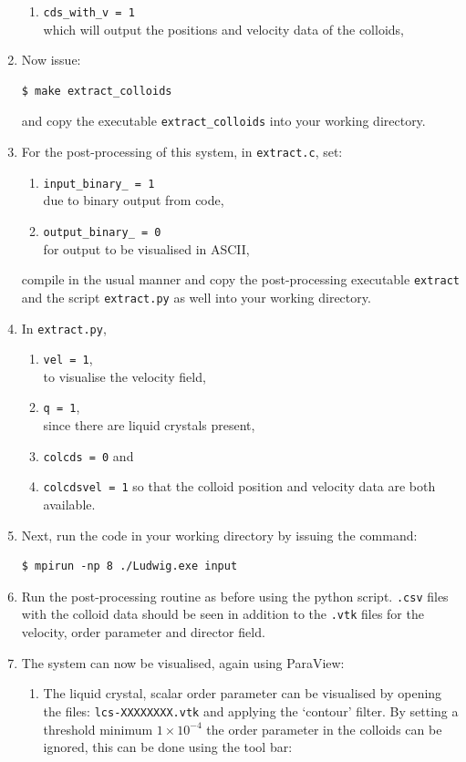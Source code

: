 \documentclass[11pt,twoside,a4paper]{article}
\begin{document}
\begin{enumerate}
\begin{enumerate}
\item \texttt{cds\_with\_v  = 1} \\ which will output the positions and velocity data of the colloids,
\end{enumerate}
\item Now issue: \\
\begin{lstlisting}
$ make extract_colloids
\end{lstlisting}
and copy the executable \texttt{extract\_colloids} into your working directory.
\item For the post-processing of this system, in \texttt{extract.c}, set:
\begin{enumerate}
\item \texttt{input\_binary\_  = 1} \\ due to binary output from code,
\item \texttt{output\_binary\_ = 0} \\ for output to be visualised in ASCII,
\end{enumerate}
compile in the usual manner and copy the post-processing executable \texttt{extract} and 
the script \texttt{extract.py} as well into your working directory. 
\item In \texttt{extract.py},
\begin{enumerate}
\item \texttt{vel = 1}, \\ to visualise the velocity field,
\item \texttt{q = 1}, \\ since there are liquid crystals present,
\item \texttt{colcds = 0} and 
\item \texttt{colcdsvel = 1} so that the colloid position and velocity data are both available.
\end{enumerate}

\item Next, run the code in your working directory by issuing the command:
\begin{lstlisting}
$ mpirun -np 8 ./Ludwig.exe input
\end{lstlisting}

\item Run the post-processing routine as before using the python script. 
\texttt{.csv} files with the colloid data should 
be seen in addition to the \texttt{.vtk} files for the velocity, order parameter and director field.
\item The system can now be visualised, again using ParaView:
\begin{enumerate}
\item The liquid crystal, scalar order parameter can be visualised by opening the files: 
\texttt{lcs-XXXXXXXX.vtk} and applying the `contour' filter. By setting a threshold 
minimum $1 \times 10^{-4}$ the order parameter in the colloids can be ignored, this can be done using the tool bar:


\end{enumerate}
\end{enumerate}
\end{document}
